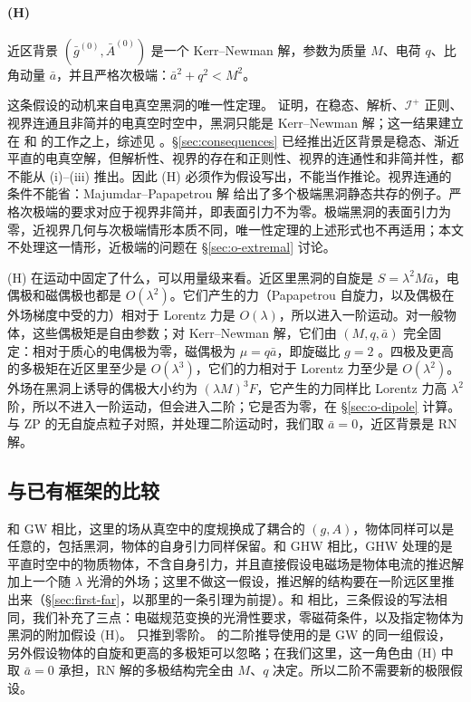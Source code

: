 \documentclass[11pt,a4paper]{ctexart}
\begin{document}
\paragraph{(H)} 近区背景 $(\bar g^{(0)},\bar A^{(0)})$ 是一个 Kerr--Newman 解，参数为质量 $M$、电荷 $q$、比角动量 $\bar a$，并且严格次极端：$\bar a^2+q^2<M^2$。

\medskip
这条假设的动机来自电真空黑洞的唯一性定理。\citet{LopesCosta2010} 证明，在稳态、解析、$\mathcal I^+$ 正则、视界连通且非简并的电真空时空中，黑洞只能是 Kerr--Newman 解；这一结果建立在 \citet{Mazur1982} 和 \citet{Bunting1983} 的工作之上，综述见 \citet{ChruscielLopesCostaHeusler2012}。\S\ref{sec:consequences} 已经推出近区背景是稳态、渐近平直的电真空解，但解析性、视界的存在和正则性、视界的连通性和非简并性，都不能从 (i)--(iii) 推出。因此 (H) 必须作为假设写出，不能当作推论。视界连通的条件不能省：Majumdar--Papapetrou 解 \citep{Majumdar1947,Papapetrou1947} 给出了多个极端黑洞静态共存的例子。严格次极端的要求对应于视界非简并，即表面引力不为零。极端黑洞的表面引力为零，近视界几何与次极端情形本质不同，唯一性定理的上述形式也不再适用；本文不处理这一情形，近极端的问题在 \S\ref{sec:o-extremal} 讨论。

(H) 在运动中固定了什么，可以用量级来看。近区里黑洞的自旋是 $S=\lambda^2M\bar a$，电偶极和磁偶极也都是 $O(\lambda^2)$。它们产生的力（Papapetrou 自旋力，以及偶极在外场梯度中受的力）相对于 Lorentz 力是 $O(\lambda)$，所以进入一阶运动。对一般物体，这些偶极矩是自由参数；对 Kerr--Newman 解，它们由 $(M,q,\bar a)$ 完全固定：相对于质心的电偶极为零，磁偶极为 $\mu=q\bar a$，即旋磁比 $g=2$ \citep{Carter1968}。四极及更高的多极矩在近区里至少是 $O(\lambda^3)$，它们的力相对于 Lorentz 力至少是 $O(\lambda^2)$。外场在黑洞上诱导的偶极大小约为 $(\lambda M)^3F$，它产生的力同样比 Lorentz 力高 $\lambda^2$ 阶，所以不进入一阶运动，但会进入二阶；它是否为零，在 \S\ref{sec:o-dipole} 计算。与 ZP 的无自旋点粒子对照，并处理二阶运动时，我们取 $\bar a=0$，近区背景是 RN 解。

\subsection{与已有框架的比较}\label{sec:compare}

和 GW 相比，这里的场从真空中的度规换成了耦合的 $(g,A)$，物体同样可以是任意的，包括黑洞，物体的自身引力同样保留。和 GHW 相比，GHW 处理的是平直时空中的物质物体，不含自身引力，并且直接假设电磁场是物体电流的推迟解加上一个随 $\lambda$ 光滑的外场；这里不做这一假设，推迟解的结构要在一阶远区里推出来（\S\ref{sec:first-far}，以那里的一条引理为前提）。和 \citet{Gralla2010} 相比，三条假设的写法相同，我们补充了三点：电磁规范变换的光滑性要求，零磁荷条件，以及指定物体为黑洞的附加假设 (H)。\citet{Gralla2010} 只推到零阶。\citet{Gralla2012} 的二阶推导使用的是 GW 的同一组假设，另外假设物体的自旋和更高的多极矩可以忽略；在我们这里，这一角色由 (H) 中取 $\bar a=0$ 承担，RN 解的多极结构完全由 $M$、$q$ 决定。所以二阶不需要新的极限假设。
\end{document}
